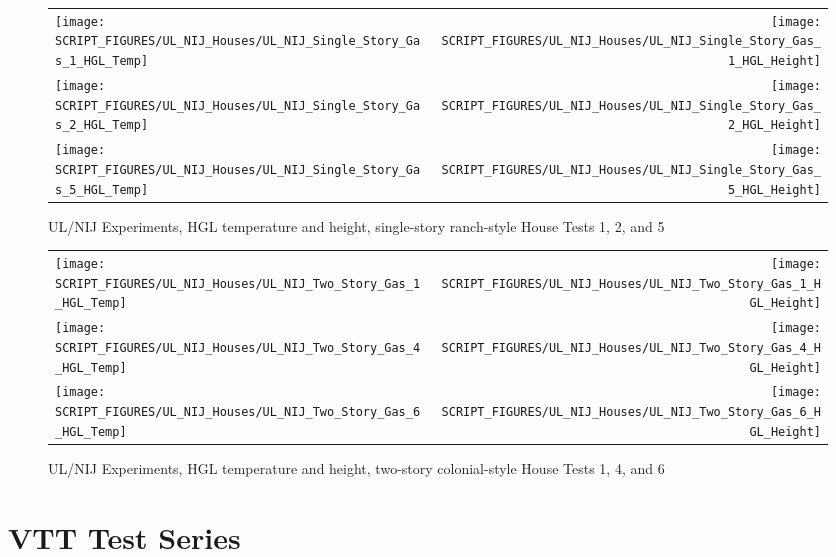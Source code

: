 \begin{figure}[p]
\begin{tabular*}{\textwidth}{l@{\extracolsep{\fill}}r}
\texttt{[image: SCRIPT\_FIGURES/UL\_NIJ\_Houses/UL\_NIJ\_Single\_Story\_Gas\_1\_HGL\_Temp]} &
\texttt{[image: SCRIPT\_FIGURES/UL\_NIJ\_Houses/UL\_NIJ\_Single\_Story\_Gas\_1\_HGL\_Height]} \\
\texttt{[image: SCRIPT\_FIGURES/UL\_NIJ\_Houses/UL\_NIJ\_Single\_Story\_Gas\_2\_HGL\_Temp]} &
\texttt{[image: SCRIPT\_FIGURES/UL\_NIJ\_Houses/UL\_NIJ\_Single\_Story\_Gas\_2\_HGL\_Height]} \\
\texttt{[image: SCRIPT\_FIGURES/UL\_NIJ\_Houses/UL\_NIJ\_Single\_Story\_Gas\_5\_HGL\_Temp]} &
\texttt{[image: SCRIPT\_FIGURES/UL\_NIJ\_Houses/UL\_NIJ\_Single\_Story\_Gas\_5\_HGL\_Height]} \\
\end{tabular*}
\caption[UL/NIJ Experiments, HGL temperature and height, Tests 1, 2, and 5]{UL/NIJ Experiments, HGL temperature and height, single-story ranch-style House Tests 1, 2, and 5}
\label{UL_NIJ_HGL_1}
\end{figure}

\begin{figure}[p]
\begin{tabular*}{\textwidth}{l@{\extracolsep{\fill}}r}
\texttt{[image: SCRIPT\_FIGURES/UL\_NIJ\_Houses/UL\_NIJ\_Two\_Story\_Gas\_1\_HGL\_Temp]} &
\texttt{[image: SCRIPT\_FIGURES/UL\_NIJ\_Houses/UL\_NIJ\_Two\_Story\_Gas\_1\_HGL\_Height]} \\
\texttt{[image: SCRIPT\_FIGURES/UL\_NIJ\_Houses/UL\_NIJ\_Two\_Story\_Gas\_4\_HGL\_Temp]} &
\texttt{[image: SCRIPT\_FIGURES/UL\_NIJ\_Houses/UL\_NIJ\_Two\_Story\_Gas\_4\_HGL\_Height]} \\
\texttt{[image: SCRIPT\_FIGURES/UL\_NIJ\_Houses/UL\_NIJ\_Two\_Story\_Gas\_6\_HGL\_Temp]} &
\texttt{[image: SCRIPT\_FIGURES/UL\_NIJ\_Houses/UL\_NIJ\_Two\_Story\_Gas\_6\_HGL\_Height]} \\
\end{tabular*}
\caption[UL/NIJ Experiments, HGL temperature and height, Tests 1, 4, and 6]{UL/NIJ Experiments, HGL temperature and height, two-story colonial-style House Tests 1, 4, and 6}
\label{UL_NIJ_HGL_2}
\end{figure}

\clearpage

\section{VTT Test Series}

